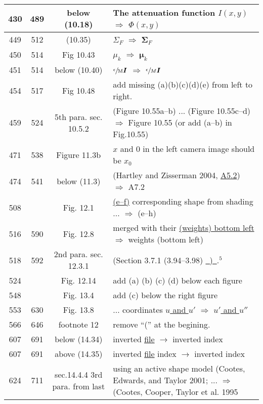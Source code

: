 \documentclass[10pt]{article}
\begin{document}
\begin{tabular}{|c|c|c|l|}
430 & 489 & below (10.18) & The attenuation function \underline{$I(x,y)$} $\Rightarrow$ $\Phi(x,y)$ \\\hline
449 & 512 & (10.35) & $\Sigma_F$ $\Rightarrow$ $\boldsymbol{\Sigma}_F$ \\\hline
450 & 514 & Fig 10.43 & $\mu_k$ $\Rightarrow$ $\boldsymbol{\mu}_k$ \\\hline
451 & 514 & below (10.40) & $\sfrac{\epsilon}{\mathrm{M}}\boldsymbol{I}$ $\Rightarrow$ $\sfrac{\epsilon}{M}\boldsymbol{I}$ \\\hline
454 & 517 & Fig 10.48 & add missing (a)(b)(c)(d)(e) from left to right. \\\hline
459 & 524 & 5th para. sec. 10.5.2 & (Figure 10.55a--b) ... (Figure 10.55c--d) $\Rightarrow$ Figure 10.55 (or add (a--b) in Fig.10.55)\\\hline
471 & 538 & Figure 11.3b & $x$ and 0 in the left camera image should be $x_0$ \\\hline
474 & 541 & below (11.3) & (Hartley and Zisserman 2004, \underline{A5.2}) $\Rightarrow$ A7.2 \\\hline
508 &       & Fig. 12.1 & \underline{(e--f)} corresponding shape from shading ...  $\Rightarrow$ (e--h) \\\hline
516 & 590 & Fig. 12.8 & merged with their \underline{(weights) bottom left} $\Rightarrow$ weights (bottom left) \\\hline
518 & 592 & 2nd para. sec. 12.3.1 & (Section 3.7.1 (3.94--3.98) \underline{\ )\ }.${}^\mathrm{5}$  \\\hline
524 &        & Fig. 12.14 & add (a) (b) (c) (d) below each figure \\\hline
548 &       & Fig. 13.4 & add (c) below the right figure \\\hline
553 & 630 & Fig. 13.8 & ... coordinates \underline{$u$ and $u'$} $\Rightarrow$ \underline{$u'$ and $u''$} \\\hline
566 & 646 & footnote 12 & remove ``('' at the begining. \\\hline
607 & 691 & below (14.34) & inverted \underline{file} $\rightarrow$ inverted index \\\hline
607 & 691 & above (14.35) & inverted \underline{file} index $\rightarrow$ inverted index \\\hline
624 & 711  & sec.14.4.4 3rd para. from last & \parbox[c]{.5\linewidth}{ using an active shape model (Cootes, Edwards, and Taylor 2001; ... $\Rightarrow$ (Cootes, Cooper, Taylor et al. 1995 } \\\hline

\end{tabular}
\end{document}

